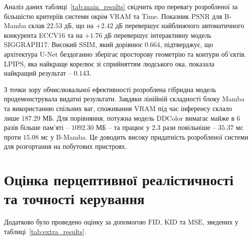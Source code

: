         Аналіз даних таблиці~\ref{tab:main_results} свідчить про перевагу розробленої за більшістю критеріїв системи окрім $\mathrm{VRAM}$ та $\mathrm{Time}$.
        Показник $\mathrm{PSNR}$ для B-Mamba склав $22.53$ дБ, що на $+2.42$ дБ перевершує найближчого автоматичного конкурента ECCV16 та на $+1.76$ дБ перевершує інтерактивну модель SIGGRAPH17.
        Високий $\mathrm{SSIM}$, який дорівнює $0.664$, підтверджує, що архітектура U-Net бездоганно зберігає просторову геометрію та контури об'єктів.
        $\mathrm{LPIPS}$, яка найкраще корелює зі сприйняттям людського ока, показала найкращий результат -- $0.143$.

        З точки зору обчислювальної ефективності розроблена гібридна модель продемонструвала видатні результати.
        Завдяки лінійній складності блоку Mamba та використанню спільних ваг, споживання $\mathrm{VRAM}$ під час інференсу склало лише $187.29$ МБ.
        Для порівняння, потужна модель DDColor вимагає майже в 6 разів більше пам'яті -- $1092.30$ МБ -- та працює у 2.3 рази повільніше -- $35.37$ мс проти $15.08$ мс у B-Mamba.
        Це доводить високу придатність розробленої системи для розгортання на побутових пристроях.

    \section{Оцінка перцептивної реалістичності та точності керування}

        Додатково було проведено оцінку за допомогою $\mathrm{FID}$, $\mathrm{KID}$ та $\mathrm{MSE}$, зведених у таблиці~\ref{tab:extra_results}.

